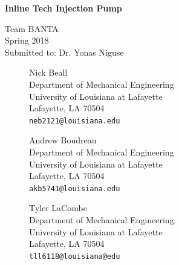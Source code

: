 \documentclass[12pt]{article}
\begin{document}
\thispagestyle{empty}
\begin{center}
\vspace*{1.25in}
{\LARGE \textbf{Inline Tech Injection Pump}} %

{\Large Team BANTA\\ Spring 2018\\ \vspace*{0.1in}Submitted to: Dr. Yonas Niguse}

\vspace{1.0in}

\begin{figure}[!h]
\begin{minipage}{0.45\textwidth}
\begin{center}
Nick Beall \\
Department of Mechanical Engineering\\
University of Louisiana at Lafayette\\
Lafayette, LA 70504\\
{\tt neb2121@louisiana.edu}
\end{center}
\end{minipage}
\hspace{0.08\textwidth}
\begin{minipage}{0.45\textwidth}
\begin{center}
Andrew Boudreau \\
Department of Mechanical Engineering\\
University of Louisiana at Lafayette\\
Lafayette, LA 70504\\
\tt{akb5741@louisiana.edu}
\end{center}
\end{minipage}
\end{figure}
%
\vspace{0.2in}
\begin{figure}[!h]
\begin{minipage}{0.45\textwidth}
\begin{center}
Tyler LaCombe \\
Department of Mechanical Engineering\\
University of Louisiana at Lafayette\\
Lafayette, LA 70504\\
{\tt tll6118@louisiana@edu}
\end{center}
\end{minipage}
\hspace{0.08\textwidth}

\end{figure}
\end{center}
\end{document}
